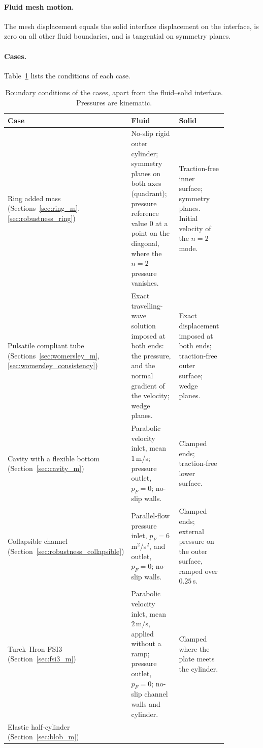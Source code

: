 \paragraph{Fluid mesh motion.}
The mesh displacement equals the solid interface displacement on the interface, is zero on all other fluid boundaries, and is tangential on symmetry planes.

\paragraph{Cases.}
Table~\ref{tab:app_bcs} lists the conditions of each case.

\begin{table}[htbp]
\centering
\caption{Boundary conditions of the cases, apart from the fluid--solid interface. Pressures are kinematic.}
\label{tab:app_bcs}
\footnotesize
\begin{tabular}{@{}p{0.17\linewidth}p{0.41\linewidth}p{0.28\linewidth}@{}}
\toprule
Case & Fluid & Solid \\
\midrule
Ring added mass (Sections~\ref{sec:ring_m}, \ref{sec:robustness_ring}) &
No-slip rigid outer cylinder; symmetry planes on both axes (quadrant); pressure reference value $0$ at a point on the diagonal, where the $n = 2$ pressure vanishes. &
Traction-free inner surface; symmetry planes. Initial velocity of the $n = 2$ mode. \\
Pulsatile compliant tube (Sections~\ref{sec:womersley_m}, \ref{sec:womersley_consistency}) &
Exact travelling-wave solution imposed at both ends: the pressure, and the normal gradient of the velocity; wedge planes. &
Exact displacement imposed at both ends; traction-free outer surface; wedge planes. \\
Cavity with a flexible bottom (Section~\ref{sec:cavity_m}) &
Parabolic velocity inlet, mean $1$\,m/s; pressure outlet, $p_F = 0$; no-slip walls. &
Clamped ends; traction-free lower surface. \\
Collapsible channel (Section~\ref{sec:robustness_collapsible}) &
Parallel-flow pressure inlet, $p_F = 6$\,m$^2$/s$^2$, and outlet, $p_F = 0$; no-slip walls. &
Clamped ends; external pressure on the outer surface, ramped over $0.25$\,s. \\
Turek--Hron FSI3 (Section~\ref{sec:fsi3_m}) &
Parabolic velocity inlet, mean $2$\,m/s, applied without a ramp; pressure outlet, $p_F = 0$; no-slip channel walls and cylinder. &
Clamped where the plate meets the cylinder. \\
Elastic half-cylinder (Section~\ref{sec:blob_m}) &

\end{tabular}
\end{table}
